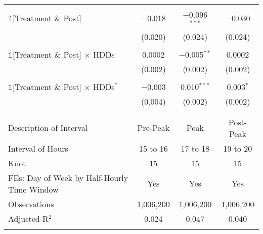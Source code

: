 \begin{table}[!htbp]
\begin{tabular}{@{\extracolsep{95pt}}lccc}
  & & & \\ 
 $\mathbb{1}$[Treatment \& Post] & $-$0.018 & $-$0.096$^{***}$ & $-$0.030 \\ 
  & (0.020) & (0.024) & (0.024) \\ 
  & & & \\ 
 $\mathbb{1}$[Treatment \& Post] $\times$ HDDs & 0.0002 & $-$0.005$^{**}$ & 0.0002 \\ 
  & (0.002) & (0.002) & (0.002) \\ 
  & & & \\ 
 $\mathbb{1}$[Treatment \& Post] $\times$ HDDs$^{*}$ & $-$0.003 & 0.010$^{***}$ & 0.003$^{*}$ \\ 
  & (0.004) & (0.002) & (0.002) \\ 
  & & & \\ 
\hline \\[-1.8ex] 
Description of Interval & Pre-Peak & Peak & Post-Peak \\ 
Interval of Hours & 15 to 16 & 17 to 18 & 19 to 20 \\ 
Knot & 15 & 15 & 15 \\ 
FEs: Day of Week by Half-Hourly Time Window & Yes & Yes & Yes \\ 
Observations & 1,006,200 & 1,006,200 & 1,006,200 \\ 
Adjusted R$^{2}$ & 0.024 & 0.047 & 0.040 \\ 
\hline 
\hline \\[-1.8ex] 
\end{tabular} 
\end{table} 
